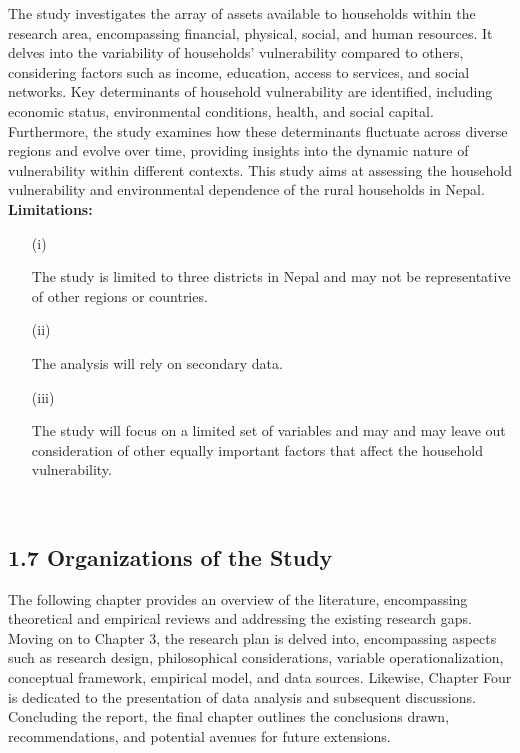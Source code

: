 \documentclass[12pt, a4paper]{article}
\begin{document}
The study investigates the array of assets available to households within the research area, encompassing financial, physical, social, and human resources. It delves into the variability of households' vulnerability compared to others, considering factors such as income, education, access to services, and social networks. Key determinants of household vulnerability are identified, including economic status, environmental conditions, health, and social capital. Furthermore, the study examines how these determinants fluctuate across diverse regions and evolve over time, providing insights into the dynamic nature of vulnerability within different contexts.
This study aims at assessing the household vulnerability and environmental dependence of the rural households in Nepal.\\
\newline
\textbf{Limitations:}
\begin{enumerate}
	\item[(i)] \parbox[t]{\linewidth}{The study is limited to three districts in Nepal and may not be representative of 
	other regions or countries.}
	\item[(ii)] \parbox[t]{\linewidth}{The analysis will rely on secondary data.}
	\item[(iii)] \parbox[t]{\linewidth}{The study will focus on a limited set of variables and may  and may leave out consideration of other equally important factors that affect the household vulnerability.}\\
\end{enumerate}

\subsection*{1.7 Organizations of the Study}
\renewcommand{\thepage}{\arabic{page}}
The following chapter provides an overview of the literature, encompassing
theoretical and empirical reviews and addressing the existing research gaps. Moving on to Chapter 3, the research plan is delved into, encompassing aspects such as research design, philosophical considerations, variable operationalization, conceptual framework, empirical model, and data sources. Likewise, Chapter Four is dedicated to the presentation of data analysis and subsequent discussions. Concluding
the report, the final chapter outlines the conclusions drawn, recommendations, and
potential avenues for future extensions.
\end{document}
